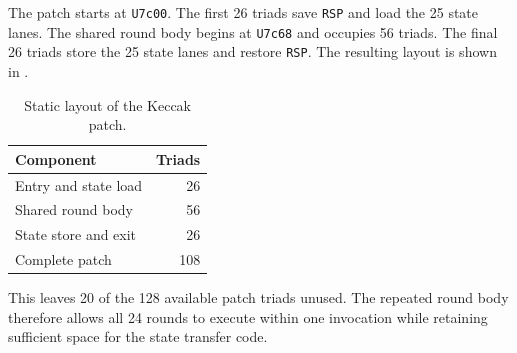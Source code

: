 \documentclass[journal=tches,submission]{iacrtrans}
\begin{document}
The patch starts at \texttt{U7c00}.
The first 26 triads save \texttt{RSP} and load the 25 state lanes.
The shared round body begins at \texttt{U7c68} and occupies 56 triads.
The final 26 triads store the 25 state lanes and restore \texttt{RSP}.
The resulting layout is shown in .

\begin{table}[!ht]
\centering
\caption{Static layout of the Keccak patch.}
\label{tabkeccakpatch}
\begin{tabular}{@{}lr@{}}
\toprule
Component & Triads \\
\midrule
Entry and state load & 26 \\
Shared round body    & 56 \\
State store and exit & 26 \\
\midrule
Complete patch       & 108 \\
\bottomrule
\end{tabular}
\end{table}

This leaves 20 of the 128 available patch triads unused.
The repeated round body therefore allows all 24 rounds to execute within one invocation while retaining sufficient space for the state transfer code.




\end{document}
